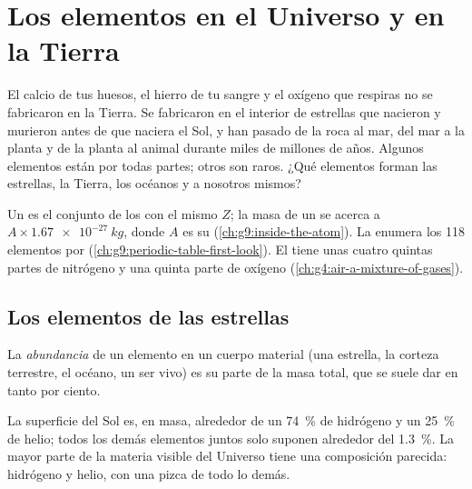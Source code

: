 \chapter{Los elementos en el Universo y en la Tierra}\label{ch:g9:elements-universe-earth}

El calcio de tus huesos, el hierro de tu sangre y el oxígeno que
respiras no se fabricaron en la Tierra. Se fabricaron en el interior de
estrellas que nacieron y murieron antes de que naciera el Sol, y han
pasado de la roca al mar, del mar a la planta y de la planta al animal
durante miles de millones de años. Algunos elementos están por todas
partes; otros son raros. ¿Qué elementos forman las estrellas, la Tierra,
los océanos y a nosotros mismos?

\begin{recall}
Un  es el conjunto de los  con el mismo  $Z$; la masa de un  se acerca a
$A \times \qty{1.67e-27}{kg}$, donde $A$ es su 
(\cref{ch:g9:inside-the-atom}). La  enumera los 118
elementos por  (\cref{ch:g9:periodic-table-first-look}).
El  tiene unas cuatro quintas partes de nitrógeno y una quinta
parte de oxígeno (\cref{ch:g4:air-a-mixture-of-gases}).
\end{recall}

\section{Los elementos de las estrellas}

\begin{definition}[Abundancia]\label{def:g9:elements-universe-earth:abundance}
La \emph{abundancia} de un elemento en un cuerpo
material (una estrella, la corteza terrestre, el océano, un ser vivo) es
su parte de la masa total, que se suele dar en tanto por ciento.
\end{definition}

\begin{proposition}\label{prop:g9:elements-universe-earth:sun}
La superficie del Sol es, en masa, alrededor de un \qty{74}{\percent}
de hidrógeno y un \qty{25}{\percent} de helio; todos los demás elementos
juntos solo suponen alrededor del \qty{1.3}{\percent}. La mayor parte de
la materia visible del Universo tiene una composición parecida:
hidrógeno y helio, con una pizca de todo lo demás.
\end{proposition}


